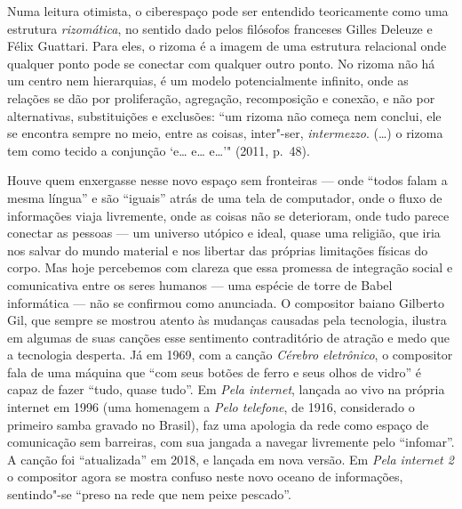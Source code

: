 Numa leitura otimista, o ciberespaço pode ser entendido teoricamente
como uma estrutura \emph{rizomática}, no sentido dado pelos filósofos
franceses Gilles Deleuze e Félix Guattari. Para eles, o
rizoma é a imagem de uma estrutura relacional onde qualquer ponto pode
se conectar com qualquer outro ponto. No rizoma não há um centro nem
hierarquias, é um modelo potencialmente infinito, onde as relações se
dão por proliferação, agregação, recomposição e conexão, e não por
alternativas, substituições e exclusões: ``um rizoma não começa nem
conclui, ele se encontra sempre no meio, entre as coisas, inter"-ser,
\emph{intermezzo}. (\ldots{}) o rizoma tem
como tecido a conjunção `e\ldots{} e\ldots{} e\ldots{}'" (2011, p.~48).

Houve quem enxergasse nesse novo espaço sem fronteiras --- onde ``todos
falam a mesma língua'' e são ``iguais'' atrás de uma tela de computador,
onde o fluxo de informações viaja livremente, onde as coisas não se
deterioram, onde tudo parece conectar as pessoas --- um universo utópico
e ideal, quase uma religião, que iria nos salvar do mundo material e nos
libertar das próprias limitações físicas do corpo. Mas hoje percebemos
com clareza que essa promessa de integração social e comunicativa entre
os seres humanos --- uma espécie de torre de Babel informática --- não se
confirmou como anunciada. O compositor baiano Gilberto Gil, que sempre
se mostrou atento às mudanças causadas pela tecnologia, ilustra em
algumas de suas canções esse sentimento contraditório de atração e medo
que a tecnologia desperta. Já em 1969, com a canção \emph{Cérebro
eletrônico}, o compositor fala de uma máquina que ``com seus botões de
ferro e seus olhos de vidro'' é capaz de fazer ``tudo, quase tudo''. Em
\emph{Pela internet}, lançada ao vivo na própria internet em 1996 (uma
homenagem a \emph{Pelo telefone}, de 1916, considerado o primeiro samba
gravado no Brasil), faz uma apologia da rede como espaço de comunicação
sem barreiras, com sua jangada a navegar livremente pelo ``infomar''. A
canção foi ``atualizada'' em 2018, e lançada em nova versão. Em
\emph{Pela internet 2} o compositor agora se mostra confuso neste novo oceano
de informações, sentindo"-se ``preso na rede que nem peixe
pescado''.

